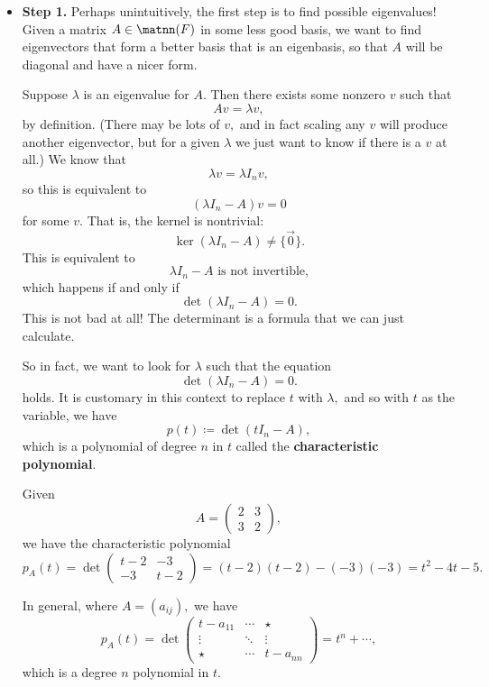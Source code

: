 \begin{itemize}
    \item \textbf{Step 1.} Perhaps unintuitively, the first step is to find possible eigenvalues! Given a matrix $A \in \matnn(F)$ in some less good basis, we want to find eigenvectors that form a better basis that is an eigenbasis, so that $A$ will be diagonal and have a nicer form. 
    
    Suppose $\lambda$ is an eigenvalue for $A.$ Then there exists some nonzero $v$ such that \[Av = \lambda v,\] by definition. (There may be lots of $v,$ and in fact scaling any $v$ will produce another eigenvector, but for a given $\lambda$ we just want to know if there is a $v$ at all.) We know that \[\lambda v = \lambda I_n v,\] so this is equivalent to \[(\lambda I_n - A) v = 0\] for some $v.$ That is, the kernel is nontrivial: \[\ker(\lambda I_n -A) \neq \{\vec{0}\}.\] This is equivalent to \[\lambda I_n - A \text{ is not invertible,}\] which happens if and only if \[\det(\lambda I_n - A) = 0.\] This is not bad at all! The determinant is a formula that we can just calculate. 
    
    So in fact, we want to look for $\lambda$ such that the equation\[\boxed{\det(\lambda I_n - A) = 0}.\]  holds. It is customary in this context to replace $t$ with $\lambda,$ and so with $t$ as the variable, we have \[p(t) \coloneqq \det(t I_n - A),\] which is a polynomial of degree $n$ in $t$ called the \textbf{characteristic polynomial}.
    
    \begin{example}
    Given \[A = \begin{pmatrix} 2 & 3 \\ 3 & 2\end{pmatrix},\] we have the characteristic polynomial \[p_A(t) = \det\begin{pmatrix} t - 2 & -3 \\ -3 & t - 2\end{pmatrix} = (t-2)(t-2) - (-3)(-3) = t^2 - 4t - 5.\]
    \end{example}
    
    In general, where $A = (a_{ij}),$ we have \[p_A(t) = \det\begin{pmatrix} t - a_{11} & \cdots & \star \\
    \vdots & \ddots & \vdots \\
    \star & \cdots & t - a_{nn}
    \end{pmatrix} = t^n + \cdots ,\] which is a degree $n$ polynomial in $t.$
    

\end{itemize}
